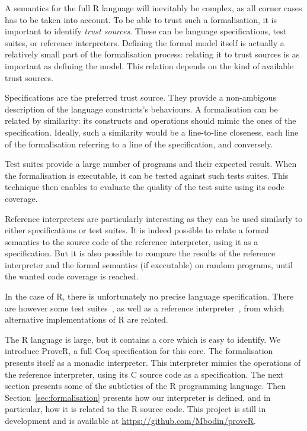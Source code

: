 \documentclass[9pt, sigplan, natbib=false, screen=true]{acmart}
\newcommand\Coq{Coq}
\newcommand\R{R}
\newcommand\Cn{C}
\begin{document}
A semantics for the full \R{} language will inevitably
be complex, as all corner cases has to be taken into account.
%
To be able to trust such a formalisation,
it is important to identify \emph{trust sources}.
These can be language specifications,
test suites,
or reference interpreters.
%
Defining the formal model itself
is actually a relatively small part of the formalisation process:
relating it to trust sources
is as important as defining the model.
This relation depends on the kind of available trust sources.

Specifications are the preferred trust source.
They provide a non-ambigous description of the language constructs's behaviours.
A formalisation can be related by similarity:
its constructs and operations should mimic the ones
of the specification.
Ideally, such a similarity would be a line-to-line closeness,
each line of the formalisation referring to a line of the specification,
and conversely.

Test suites provide a large number of programs and their expected result.
When the formalisation is executable, it can be tested against such tests suites.
This technique then enables to evaluate the quality of the test suite
using its code coverage.

Reference interpreters are particularly interesting as
they can be used similarly to either specifications or test suites.
It is indeed possible to relate a formal semantics
to the source code of the reference interpreter,
using it as a specification.
But it is also possible to compare the results of the reference interpreter
and the formal semantics (if executable) on random programs,
until the wanted code coverage is reached.

In the case of \R{}, there is unfortunately
no precise language specification.
There are however some test suites~\parencite{2014testr, maj2013testr},
as well as a reference interpreter~\parencite{team2000r},
from which alternative implementations of \R{} are related.

The \R{} language is large,
but it contains a core which is easy to identify.
We introduce ProveR, a full \Coq{} specification for this core.
The formalisation presents itself as a monadic interpreter.
This interpreter mimics the operations of the reference interpreter,
using its \Cn{} source code as a specification.
%
The next section presents some of the subtleties of the \R{} programming language.
Then Section~\ref{sec:formalisation} presents how our interpreter is defined,
and in particular, how it is related to the \R{} source code.
This project is still in development
and is available at \url{https://github.com/Mbodin/proveR}.
\end{document}

